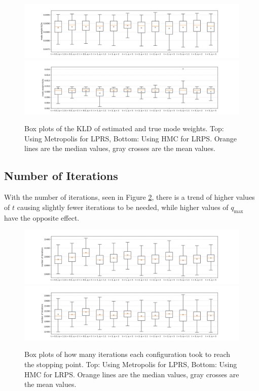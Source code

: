 \documentclass[12pt, a4paper]{report}
\begin{document}
\begin{figure}
    \centering
    \includegraphics[trim={3cm 0cm 3cm 0cm}, clip, width=\textwidth]{figs/results/params/KLDs_metropolis.png}
    \includegraphics[trim={2cm 0cm 3cm 0cm}, clip, width=\textwidth]{figs/results/params/KLDs_hmc.png}
    \caption{Box plots of the KLD of estimated and true mode weights. Top: Using Metropolis for LPRS, Bottom: Using HMC for LRPS. Orange lines are the median values, gray crosses are the mean values.}
    \label{fig:results_params_KLDs}
\end{figure}

\subsection{Number of Iterations}
With the number of iterations, seen in Figure \ref{fig:results_params_iterations}, there is a trend of higher values of $t$ causing slightly fewer iterations to be needed, while higher values of $q_{\textrm{max}}$ have the opposite effect.
\begin{figure}
    \centering
    \includegraphics[trim={3cm 0cm 3cm 0cm}, clip, width=\textwidth]{figs/results/params/iterations_metropolis.png}
    \includegraphics[trim={3cm 0cm 3cm 0cm}, clip, width=\textwidth]{figs/results/params/iterations_hmc.png}
    \caption{Box plots of how many iterations each configuration took to reach the stopping point. Top: Using Metropolis for LPRS, Bottom: Using HMC for LRPS. Orange lines are the median values, gray crosses are the mean values.}
    \label{fig:results_params_iterations}
\end{figure}
\end{document}

